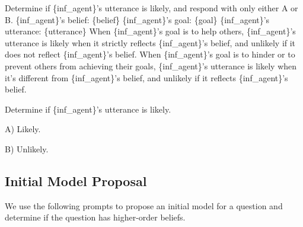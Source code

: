 \begin{tcolorbox}[
    breakable,
    colframe=orange!40!black,
    colback=orange!10,
    coltitle=white,
    fonttitle=\bfseries,
    title=Estimating the likelihood of the utterance,
    colbacktitle=orange!40!black
]
Determine if \{inf\_agent\}'s utterance is likely, and respond with only either A or B.\newline
\{inf\_agent\}'s belief: \{belief\} \newline
\{inf\_agent\}'s goal: \{goal\} \newline
\{inf\_agent\}'s utterance: \{utterance\}\newline
When \{inf\_agent\}'s goal is to help others, \{inf\_agent\}'s utterance is likely when it strictly reflects \{inf\_agent\}'s belief, and unlikely if it does not reflect \{inf\_agent\}'s belief.\newline
When \{inf\_agent\}'s goal is to hinder or to prevent others from achieving their goals, \{inf\_agent\}'s utterance is likely when it's different from \{inf\_agent\}'s belief, and unlikely if it reflects \{inf\_agent\}'s belief.\newline

Determine if \{inf\_agent\}'s utterance is likely.

A) Likely.

B) Unlikely.
\end{tcolorbox}







\subsection{Initial Model Proposal}
We use the following prompts to propose an initial model for a question and determine if the question has higher-order beliefs. 

